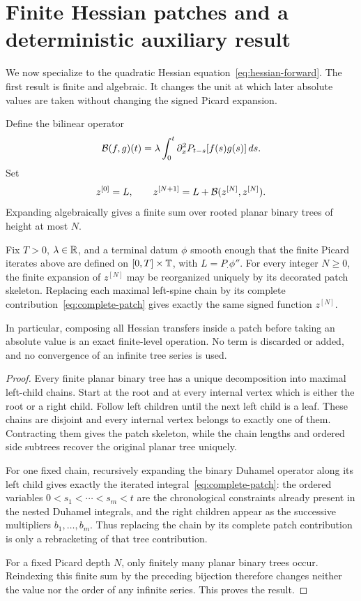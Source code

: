 \section{Finite Hessian patches and a deterministic auxiliary result}
\label{sec:patches}

We now specialize to the quadratic Hessian equation~\eqref{eq:hessian-forward}. The first result is finite and algebraic. It changes the unit at which later absolute values are taken without changing the signed Picard expansion.

Define the bilinear operator
\begin{equation*}
  \mathcal B(f,g)(t)
  =
  \lambda\int_0^t
  \partial_x^2P_{t-s}[f(s)g(s)]\,ds.
\end{equation*}
Set
\begin{equation*}
  z^{[0]}=L,
  \qquad
  z^{[N+1]}=L+\mathcal B(z^{[N]},z^{[N]}).
\end{equation*}
Expanding algebraically gives a finite sum over rooted planar binary trees of height at most $N$.

\begin{theorem}
\label{thm:finite-patch-regrouping}
Fix $T>0$, $\lambda\in\mathbb R$, and a terminal datum $\phi$ smooth enough that the finite Picard iterates above are defined on $[0,T]\times\mathbb T$, with $L=P_\cdot\phi''$. For every integer $N\geq0$, the finite expansion of $z^{[N]}$ may be reorganized uniquely by its decorated patch skeleton. Replacing each maximal left-spine chain by its complete contribution~\eqref{eq:complete-patch} gives exactly the same signed function $z^{[N]}$.

In particular, composing all Hessian transfers inside a patch before taking an absolute value is an exact finite-level operation. No term is discarded or added, and no convergence of an infinite tree series is used.
\end{theorem}

\begin{proof}
Every finite planar binary tree has a unique decomposition into maximal left-child chains. Start at the root and at every internal vertex which is either the root or a right child. Follow left children until the next left child is a leaf. These chains are disjoint and every internal vertex belongs to exactly one of them. Contracting them gives the patch skeleton, while the chain lengths and ordered side subtrees recover the original planar tree uniquely.

For one fixed chain, recursively expanding the binary Duhamel operator along its left child gives exactly the iterated integral~\eqref{eq:complete-patch}: the ordered variables $0<s_1<\cdots<s_m<t$ are the chronological constraints already present in the nested Duhamel integrals, and the right children appear as the successive multipliers $b_1,\ldots,b_m$. Thus replacing the chain by its complete patch contribution is only a rebracketing of that tree contribution.

For a fixed Picard depth $N$, only finitely many planar binary trees occur. Reindexing this finite sum by the preceding bijection therefore changes neither the value nor the order of any infinite series. This proves the result.
\end{proof}

